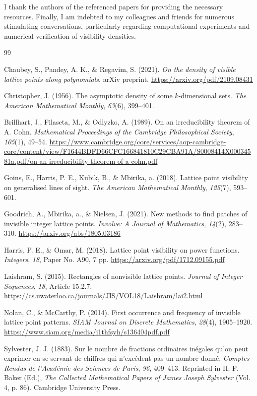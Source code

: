 \documentclass[12pt, reqno]{amsart}
\theoremstyle{definition}
\theoremstyle{remark}
\numberwithin{equation}{section}
\begin{document}
 I thank the authors of the referenced papers for providing the necessary resources. Finally, I am indebted to my colleagues and friends for numerous stimulating conversations, particularly regarding computational experiments and numerical verification of visibility densities.



\begin{thebibliography}{99}

Chaubey, S., Pandey, A. K., \& Regavim, S. (2021).
\textit{On the density of visible lattice points along polynomials}.
arXiv preprint.
\url{https://arxiv.org/pdf/2109.08431}

Christopher, J. (1956).
The asymptotic density of some $k$-dimensional sets.
\textit{The American Mathematical Monthly}, \textit{63}(6), 399--401.

Brillhart, J., Filaseta, M., \& Odlyzko, A. (1989).
On an irreducibility theorem of A. Cohn.
\textit{Mathematical Proceedings of the Cambridge Philosophical Society}, \textit{105}(1), 49--54.
\url{https://www.cambridge.org/core/services/aop-cambridge-core/content/view/F1644BDFD66CFC166841810C29CBA91A/S0008414X00034581a.pdf/on-an-irreducibility-theorem-of-a-cohn.pdf}

Goins, E., Harris, P. E., Kubik, B., \& Mbirika, a. (2018).
Lattice point visibility on generalised lines of sight.
\textit{The American Mathematical Monthly}, \textit{125}(7), 593--601.

Goodrich, A., Mbirika, a., \& Nielsen, J. (2021).
New methods to find patches of invisible integer lattice points.
\textit{Involve: A Journal of Mathematics}, \textit{14}(2), 283--310.
\url{https://arxiv.org/abs/1805.03186}

Harris, P. E., \& Omar, M. (2018).
Lattice point visibility on power functions.
\textit{Integers}, \textit{18}, Paper No. A90, 7 pp.
\url{https://arxiv.org/pdf/1712.09155.pdf}

Laishram, S. (2015).
Rectangles of nonvisible lattice points.
\textit{Journal of Integer Sequences}, \textit{18}, Article 15.2.7.
\url{https://cs.uwaterloo.ca/journals/JIS/VOL18/Laishram/lai2.html}

Nolan, C., \& McCarthy, P. (2014).
First occurrence and frequency of invisible lattice point patterns.
\textit{SIAM Journal on Discrete Mathematics}, \textit{28}(4), 1905--1920.
\url{https://www.siam.org/media/i1thfsyh/s136404pdf.pdf}

Sylvester, J. J. (1883).
Sur le nombre de fractions ordinaires in\'egales qu’on peut exprimer en se servant de chiffres qui n’exc\'edent pas un nombre donn\'e.
\textit{Comptes Rendus de l’Acad\'emie des Sciences de Paris}, \textit{96}, 409--413.
Reprinted in H. F. Baker (Ed.), \textit{The Collected Mathematical Papers of James Joseph Sylvester} (Vol. 4, p. 86). Cambridge University Press.

\end{thebibliography}
\end{document}
